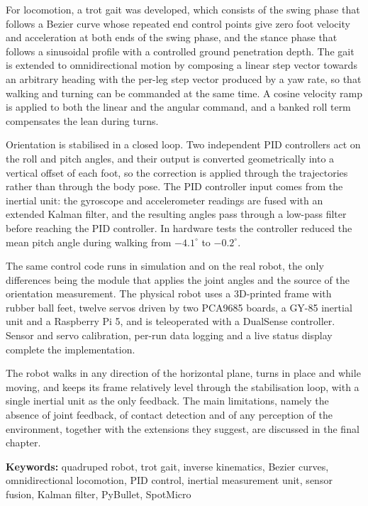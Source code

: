 \documentclass[11pt]{report}
\begin{document}
For locomotion, a trot gait was developed, which consists of the swing phase that
follows a Bezier curve whose repeated end control points give zero foot
velocity and acceleration at both ends of the swing phase, and the stance phase
that follows a sinusoidal profile with a controlled ground penetration depth. The
gait is extended to omnidirectional motion by composing a linear step
vector towards an arbitrary heading with the per-leg step vector produced by a
yaw rate, so that walking and turning can be commanded at the same time. A
cosine velocity ramp is applied to both the linear and the angular command, and
a banked roll term compensates the lean during turns.

Orientation is stabilised in a closed loop. Two independent PID controllers act
on the roll and pitch angles, and their output is converted geometrically into
a vertical offset of each foot, so the correction is applied through the
trajectories rather than through the body pose. The PID controller input comes from
the inertial unit: the gyroscope and accelerometer readings are fused with an
extended Kalman filter, and the resulting angles pass through a low-pass filter
before reaching the PID controller. In hardware tests the controller reduced the
mean pitch angle during walking from $-4.1^\circ$ to $-0.2^\circ$.

The same control code runs in simulation and on the real robot, the only
differences being the module that applies the joint angles and the source of
the orientation measurement. The physical robot uses a 3D-printed
frame with rubber ball feet, twelve servos driven by two PCA9685
boards, a GY-85 inertial unit and a Raspberry Pi 5, and is teleoperated with a
DualSense controller. Sensor and servo calibration, per-run data logging and a
live status display complete the implementation.

The robot walks in any direction of the horizontal plane, turns in place and
while moving, and keeps its frame relatively level through the stabilisation loop, with a
single inertial unit as the only feedback. The main limitations, namely the
absence of joint feedback, of contact detection and of any perception of the
environment, together with the extensions they suggest, are discussed in the
final chapter.

\vspace{1em}
\noindent\textbf{Keywords:} quadruped robot, trot gait, inverse kinematics,
Bezier curves, omnidirectional locomotion, PID control, inertial measurement
unit, sensor fusion, Kalman filter, PyBullet, SpotMicro
\newpage
\end{document}
